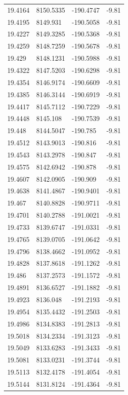 \begin{table}[H]
\begin{tabular}{llll}
19.4164 & 8150.5335 & -190.4747 & -9.81 \\
19.4195 & 8149.931 & -190.5058 & -9.81 \\
19.4227 & 8149.3285 & -190.5368 & -9.81 \\
19.4259 & 8148.7259 & -190.5678 & -9.81 \\
19.429 & 8148.1231 & -190.5988 & -9.81 \\
19.4322 & 8147.5203 & -190.6298 & -9.81 \\
19.4354 & 8146.9174 & -190.6609 & -9.81 \\
19.4385 & 8146.3144 & -190.6919 & -9.81 \\
19.4417 & 8145.7112 & -190.7229 & -9.81 \\
19.4448 & 8145.108 & -190.7539 & -9.81 \\
19.448 & 8144.5047 & -190.785 & -9.81 \\
19.4512 & 8143.9013 & -190.816 & -9.81 \\
19.4543 & 8143.2978 & -190.847 & -9.81 \\
19.4575 & 8142.6942 & -190.878 & -9.81 \\
19.4607 & 8142.0905 & -190.909 & -9.81 \\
19.4638 & 8141.4867 & -190.9401 & -9.81 \\
19.467 & 8140.8828 & -190.9711 & -9.81 \\
19.4701 & 8140.2788 & -191.0021 & -9.81 \\
19.4733 & 8139.6747 & -191.0331 & -9.81 \\
19.4765 & 8139.0705 & -191.0642 & -9.81 \\
19.4796 & 8138.4662 & -191.0952 & -9.81 \\
19.4828 & 8137.8618 & -191.1262 & -9.81 \\
19.486 & 8137.2573 & -191.1572 & -9.81 \\
19.4891 & 8136.6527 & -191.1882 & -9.81 \\
19.4923 & 8136.048 & -191.2193 & -9.81 \\
19.4954 & 8135.4432 & -191.2503 & -9.81 \\
19.4986 & 8134.8383 & -191.2813 & -9.81 \\
19.5018 & 8134.2334 & -191.3123 & -9.81 \\
19.5049 & 8133.6283 & -191.3433 & -9.81 \\
19.5081 & 8133.0231 & -191.3744 & -9.81 \\
19.5113 & 8132.4178 & -191.4054 & -9.81 \\
19.5144 & 8131.8124 & -191.4364 & -9.81 \\

\end{tabular}
\end{table}
